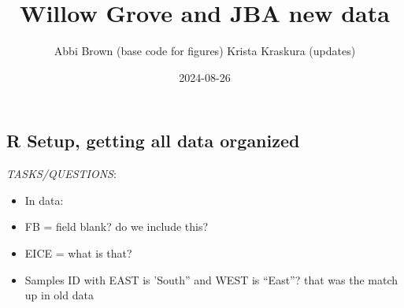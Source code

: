 \documentclass[
]{article}
\title{Willow Grove and JBA new data}
\author{Abbi Brown (base code for figures) Krista Kraskura (updates)}
\date{2024-08-26}
\providecommand{\tightlist}{%
  \setlength{\itemsep}{0pt}\setlength{\parskip}{0pt}}
\begin{document}
\maketitle

{
\setcounter{tocdepth}{4}
\tableofcontents
}
\subsection{R Setup, getting all data
organized}\label{r-setup-getting-all-data-organized}

\emph{TASKS/QUESTIONS}:

\begin{itemize}
\tightlist
\item
  In data:
\item
  FB = field blank? do we include this?
\item
  EICE = what is that?
\item
  Samples ID with EAST is 'South'' and WEST is ``East''? that was the
  match up in old data
\end{itemize}
\end{document}
